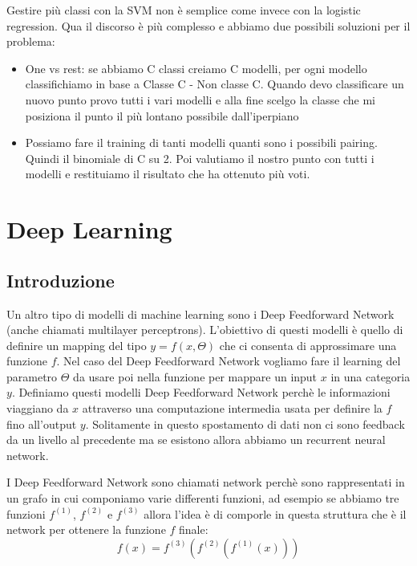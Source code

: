 \documentclass[14pt]{extreport}
\begin{document}
Gestire più classi con la SVM non è semplice come invece con la logistic regression. Qua il discorso è più complesso e abbiamo due possibili soluzioni
per il problema:

\begin{itemize}
\item One vs rest: se abbiamo C classi creiamo C modelli, per ogni modello classifichiamo in base a Classe C - Non classe C. Quando devo classificare
un nuovo punto provo tutti i vari modelli e alla fine scelgo la classe che mi posiziona il punto il più lontano possibile dall'iperpiano
\item Possiamo fare il training di tanti modelli quanti sono i possibili pairing. Quindi il binomiale di C su 2. Poi valutiamo il nostro punto con
tutti i modelli e restituiamo il risultato che ha ottenuto più voti.
\end{itemize}



\chapter{Deep Learning}

\section{Introduzione}

Un altro tipo di modelli di machine learning sono i Deep Feedforward Network (anche chiamati multilayer perceptrons). L'obiettivo di questi modelli è
quello di definire un mapping del tipo $y = f(x, \Theta)$ che ci consenta di approssimare una funzione $f$. Nel caso del Deep Feedforward Network
vogliamo fare il learning del parametro $\Theta$ da usare poi nella funzione per mappare un input $x$ in una categoria $y$. Definiamo questi modelli
Deep Feedforward Network perchè le informazioni viaggiano da $x$ attraverso una computazione intermedia usata per definire la $f$ fino all'output $y$.
Solitamente in questo spostamento di dati non ci sono feedback da un livello al precedente ma se esistono allora abbiamo un recurrent neural network.

I Deep Feedforward Network sono chiamati network perchè sono rappresentati in un grafo in cui componiamo varie differenti funzioni, ad esempio se
abbiamo tre funzioni $f^{(1)}$, $f^{(2)}$ e $f^{(3)}$ allora l'idea è di comporle in questa struttura che è il network per ottenere la funzione $f$ finale:
$$f(x) = f^{(3)}(f^{(2)}(f^{(1)}(x)))$$
\end{document}
